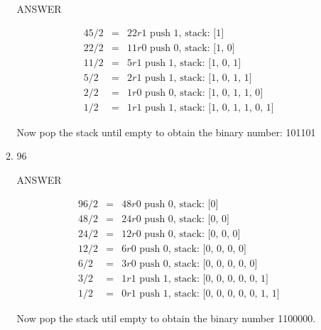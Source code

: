 \documentclass{article} %
\newenvironment{mpage}
  {\hspace{0.1in}
   \begin{minipage}{4.5in}
     \setlength{\parskip}{.5em}
     \vspace{0.1in}}    
  {\vspace{0.1in}
   \end{minipage}}
\begin{document}
\begin{enumerate}
\begin{enumerate}
        \begin{mpage}
          ANSWER

          \begin{eqnarray*}
            45 / 2 &=& 22 r 1 \text{ push 1, stack: [1]} \\
            22 / 2  &=& 11 r 0 \text{ push 0, stack: [1, 0]} \\
            11 / 2  &=& 5 r 1 \text{ push 1, stack: [1, 0, 1]} \\
            5 / 2  &=& 2 r 1 \text{ push 1, stack: [1, 0, 1, 1]} \\
            2 / 2  &=& 1 r 0 \text{ push 0, stack: [1, 0, 1, 1, 0]} \\
            1 / 2  &=& 1 r 1 \text{ push 1, stack: [1, 0, 1, 1, 0, 1]} 
          \end{eqnarray*}

          Now pop the stack until empty to obtain the binary number: 101101

          \vspace{.1in}
        \end{mpage}

    \item
        96
      
        \begin{mpage}
          ANSWER
          
          \begin{eqnarray*}
            96 / 2 &=& 48 r 0 \text{ push 0, stack: [0]} \\
            48 / 2 &=& 24 r 0 \text{ push 0, stack: [0, 0]} \\
            24 / 2 &=& 12 r 0 \text{ push 0, stack: [0, 0, 0]} \\
            12 / 2 &=& 6 r 0  \text{ push 0, stack: [0, 0, 0, 0]} \\
            6 / 2 &=& 3 r 0   \text{ push 0, stack: [0, 0, 0, 0, 0]} \\
            3 / 2 &=& 1 r 1   \text{ push 1, stack: [0, 0, 0, 0, 0, 1]} \\
            1 / 2 &=& 0 r 1   \text{ push 1, stack: [0, 0, 0, 0, 0, 1, 1]}
          \end{eqnarray*}

          Now pop the stack util empty to obtain the binary number 1100000.

          \vspace{.1in}
        \end{mpage}


\end{enumerate}
\end{enumerate}
\end{document}
